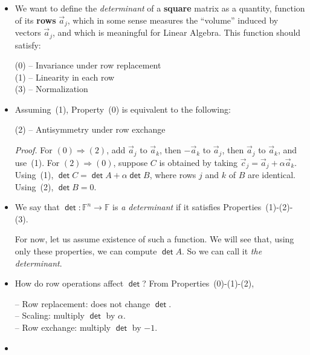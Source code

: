 \documentclass[11pt]{article}
\newcommand{\1}{\mathbf{1}}
\newcommand{\0}{\mathbf{0}}
\newcommand{\F}{\mathbb{F}}
\DeclareMathOperator{\mydet}{\mathsf{det}}
\newcommand{\va}{\vec{a}}
\newcommand{\vc}{\vec{c}}
\begin{document}
\begin{itemize}

\item

We want to define the \emph{determinant} of a \textbf{square} matrix as a quantity, function of its \textbf{rows} $\va_j$, which in some sense measures the ``volume'' induced by vectors $\va_j$, and which is meaningful for Linear Algebra. This function should satisfy:

\hspace*{2em}
(0)
--
Invariance under row replacement
\\
\hspace*{2em}
(1)
--
Linearity in each row
\\
\hspace*{2em}
(3)
--
Normalization

\item

Assuming~(1), Property~(0) is equivalent to the following:

\hspace*{2em}
(2)
--
Antisymmetry under row exchange

\emph{Proof.}
For $(0) \Rightarrow (2)$,
add $\va_j$ to $\va_k$, then $-\va_k$ to $\va_j$, then $\va_j$ to $\va_k$, and use~(1).
For $(2) \Rightarrow (0)$,
suppose $C$ is obtained by taking $\vc_j = \va_j + \alpha \va_k$. Using~(1), $\mydet C = \mydet A + \alpha \mydet B$, where rows $j$ and $k$ of $B$ are identical. Using~(2), $\mydet B = 0$.

\item

We say that $\mydet:\F^n\to\F$ is \emph{a determinant} if it satisfies Properties~(1)-(2)-(3).

For now, let us assume existence of such a function.
We will see that, using only these properties, we can compute $\mydet A$.
So we can call it \emph{the determinant}.

\item

How do row operations affect $\mydet$?
From Properties~(0)-(1)-(2),

--
Row replacement: does not change $\mydet$.
\\
--
Scaling: multiply $\mydet$ by $\alpha$.
\\
--
Row exchange: multiply $\mydet$ by $-1$.

\item


\end{itemize}
\end{document}
